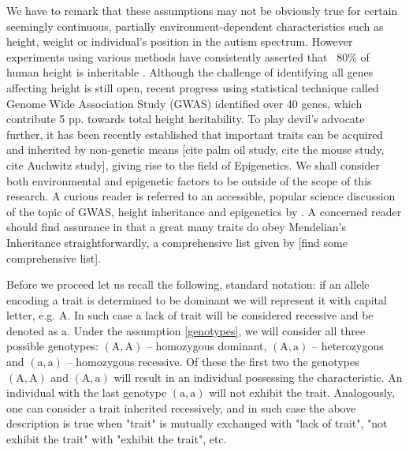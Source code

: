 \documentclass{l4proj}
\newcommand{\genotype}[2]{\ensuremath{(\mathrm{#1}, \mathrm{#2})}}
\begin{document}
We have to remark that these assumptions may not be obviously true for certain seemingly continuous, partially environment-dependent characteristics such as height, weight or individual's position in the autism spectrum. However experiments using various methods have consistently asserted that ~80\% of human height is inheritable \parencite{heightTwins, heightJustSiblings}. Although the challenge of identifying all genes affecting height is still open, recent progress using statistical technique called Genome Wide Association Study (GWAS) identified over 40 genes, which contribute 5 pp. towards total height heritability. To play devil's advocate further, it has been recently established that important traits can be acquired and inherited by non-genetic means [cite palm oil study, cite the mouse study, cite Auchwitz study], giving rise to the field of Epigenetics. We shall consider both environmental and epigenetic factors to be outside of the scope of this research. A curious reader is referred to an accessible, popular science discussion of the topic of GWAS, height inheritance and epigenetics by \textcite{GWASDiscussion}. A concerned reader should find assurance in that a great many traits do obey Mendelian's Inheritance straightforwardly, a comprehensive list given by [find some comprehensive list]. 

Before we proceed let us recall the following, standard notation: if an allele encoding a trait is determined to be dominant we will represent it with capital letter, e.g. $\mathrm{A}$. In such case a lack of trait will be considered recessive and be denoted as $\mathrm{a}$. Under the assumption \ref{genotypes}, we will consider all three possible genotypes: \genotype{A}{A} -- homozygous dominant, \genotype{A}{a} -- heterozygous and \genotype{a}{a} -- homozygous recessive. Of these the first two the genotypes \genotype{A}{A} and \genotype{A}{a} will result in an individual possessing the characteristic. An individual with the last genotype \genotype{a}{a} will not exhibit the trait. Analogously, one can consider a trait inherited recessively, and in such case the above description is true when "trait" is mutually exchanged with "lack of trait", "not exhibit the trait" with "exhibit the trait", etc.
\end{document}
